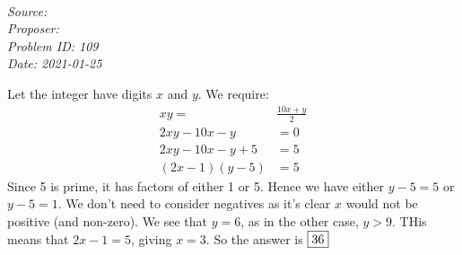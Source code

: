 \SSbreak\\
\emph{Source: \Cfolk}\\
\emph{Proposer: \Pss}\\
\emph{Problem ID: 109}\\
\emph{Date: 2021-01-25}\\
\SSbreak

\bigskip

\begin{solution}\hfil\medskip

  Let the integer have digits \(x\) and \(y\). We require:
  \begin{align*}
    xy=&\frac{10x+y}{2}\\
    2xy-10x-y&=0\\
    2xy-10x-y+5&=5\\
    (2x-1)(y-5)&=5
  \end{align*}
Since 5 is prime, it has factors of either 1 or 5. Hence we have either \(y-5=5\) or \(y-5=1\). We don't need to consider negatives as it's clear \(x\) would not be positive (and non-zero). We see that \(y=6\), as in the other case, \(y>9\). THis means that \(2x-1=5\), giving \(x=3\). So the answer is \(\fbox{36}\)
\end{solution}\bigskip
